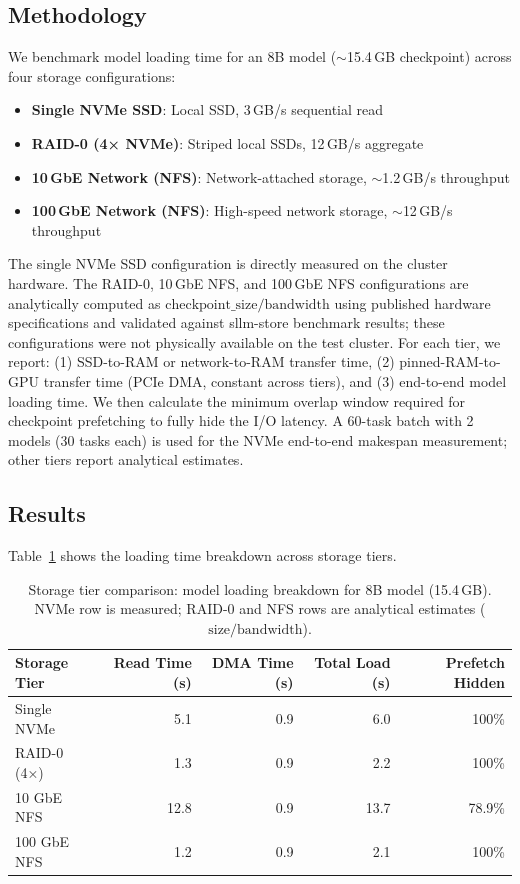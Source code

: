 \documentclass[logo,bsc,singlespacing,parskip,online]{infthesis}
\begin{document}
\subsection{Methodology}

We benchmark model loading time for an 8B model ($\sim$15.4\,GB checkpoint) across four storage configurations:
\begin{itemize}
\item \textbf{Single NVMe SSD}: Local SSD, 3\,GB/s sequential read
\item \textbf{RAID-0 (4× NVMe)}: Striped local SSDs, 12\,GB/s aggregate
\item \textbf{10\,GbE Network (NFS)}: Network-attached storage, $\sim$1.2\,GB/s throughput
\item \textbf{100\,GbE Network (NFS)}: High-speed network storage, $\sim$12\,GB/s throughput
\end{itemize}

The single NVMe SSD configuration is directly measured on the cluster hardware. The RAID-0, 10\,GbE NFS, and 100\,GbE NFS configurations are analytically computed as $\text{checkpoint\_size} / \text{bandwidth}$ using published hardware specifications and validated against sllm-store benchmark results; these configurations were not physically available on the test cluster. For each tier, we report: (1) SSD-to-RAM or network-to-RAM transfer time, (2) pinned-RAM-to-GPU transfer time (PCIe DMA, constant across tiers), and (3) end-to-end model loading time. We then calculate the minimum overlap window required for checkpoint prefetching to fully hide the I/O latency. A 60-task batch with 2 models (30 tasks each) is used for the NVMe end-to-end makespan measurement; other tiers report analytical estimates.

\subsection{Results}

Table~\ref{tab:exp5_storage_results} shows the loading time breakdown across storage tiers.

\begin{table}[htbp]
\centering
\caption{Storage tier comparison: model loading breakdown for 8B model (15.4\,GB). NVMe row is measured; RAID-0 and NFS rows are analytical estimates ($\text{size}/\text{bandwidth}$).}
\label{tab:exp5_storage_results}
\begin{tabular}{lrrrr}
\toprule
Storage Tier & Read Time (s) & DMA Time (s) & Total Load (s) & Prefetch Hidden \\
\midrule
Single NVMe & 5.1 & 0.9 & 6.0 & 100\% \\
RAID-0 (4×) & 1.3 & 0.9 & 2.2 & 100\% \\
10 GbE NFS & 12.8 & 0.9 & 13.7 & 78.9\% \\
100 GbE NFS & 1.2 & 0.9 & 2.1 & 100\% \\
\bottomrule
\end{tabular}
\end{table}
\end{document}
